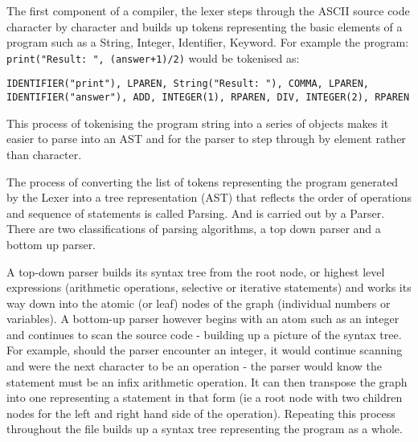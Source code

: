 \bigskip

\bigskip

The first component of a compiler, the lexer steps through the ASCII source code character by character and builds up tokens representing the basic elements of a program such as a String, Integer, Identifier, Keyword. For example the program: \texttt{print("Result: ", (answer+1)/2)} would be tokenised as:

\begin{lstlisting}
IDENTIFIER("print"), LPAREN, String("Result: "), COMMA, LPAREN, IDENTIFIER("answer"), ADD, INTEGER(1), RPAREN, DIV, INTEGER(2), RPAREN
\end{lstlisting}

This process of tokenising the program string into a series of objects makes it easier to parse into an AST and for the parser to step through by element rather than character.

The process of converting the list of tokens representing the program generated by the Lexer into a tree representation (AST) that reflects the order of operations and sequence of statements is called Parsing. And is carried out by a Parser. There are two classifications of parsing algorithms, a top down parser and a bottom up parser.

A top-down parser builds its syntax tree from the root node, or highest level expressions (arithmetic operations, selective or iterative statements) and works its way down into the atomic (or leaf) nodes of the graph (individual numbers or variables). A bottom-up parser however begins with an atom such as an integer and continues to scan the source code - building up a picture of the syntax tree. For example, should the parser encounter an integer, it would continue scanning and were the next character to be an operation - the parser would know the statement must be an infix arithmetic operation. It can then transpose the graph into one representing a statement in that form (ie a root node with two children nodes for the left and right hand side of the operation). Repeating this process throughout the file builds up a syntax tree representing the program as a whole.

